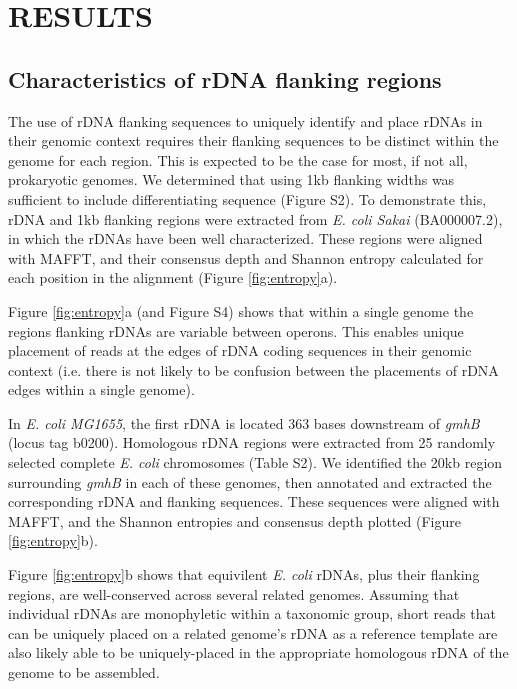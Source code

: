 \documentclass[a4,center,fleqn]{NAR}
\begin{document}
\section{RESULTS}
\subsection*{Characteristics of rDNA flanking regions}
The use of rDNA flanking sequences to uniquely identify and place rDNAs in their genomic context requires their flanking sequences to be distinct within the genome for each region. This is expected to be the case for most, if not all, prokaryotic genomes. We determined that using 1kb flanking widths was sufficient to include differentiating sequence (Figure S2). To demonstrate this, rDNA and 1kb flanking regions were extracted from \textit{E. coli Sakai} \cite{Hayashi2001} (BA000007.2), in which the rDNAs have been well characterized\cite{Ohnishi2000}. These regions were aligned with MAFFT\cite{Katoh2002}, and their consensus depth and Shannon entropy\cite{Schmitt1997} calculated for each position in the alignment (Figure \ref{fig:entropy}a).

Figure \ref{fig:entropy}a (and Figure S4) shows that within a single genome the regions flanking rDNAs are variable between operons. This enables unique placement of reads at the edges of rDNA coding sequences in their genomic context (i.e. there is not likely to be confusion between the placements of rDNA edges within a single genome).

In \textit{E. coli MG1655}, the first rDNA is located 363 bases downstream of \textit{gmhB} (locus tag b0200). Homologous rDNA regions were extracted from 25 randomly selected complete \textit{E. coli} chromosomes (Table S2).  We identified the 20kb region surrounding \textit{gmhB} in each of these genomes, then annotated and extracted the corresponding rDNA and flanking sequences. These sequences were aligned with MAFFT, and the Shannon entropies and consensus depth plotted (Figure \ref{fig:entropy}b).

Figure \ref{fig:entropy}b shows that equivilent \textit{E. coli} rDNAs, plus their flanking regions, are well-conserved across several related genomes. Assuming that individual rDNAs are monophyletic within a taxonomic group, short reads that can be uniquely placed on a related genome's rDNA as a reference template are also likely able to be uniquely-placed in the appropriate homologous rDNA of the genome to be assembled.
\end{document}
